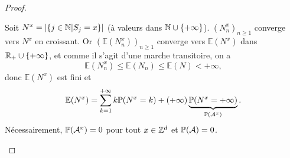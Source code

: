 \documentclass[12pt]{article}
\begin{document}
\begin{proof}
\begin{enumerate}
        Soit $N^{x}=\left\lvert\left\lbrace j\in\N\middle| S_j=x\right\rbrace\right\rvert$ (à valeurs dans $\N\cup \lbrace+\infty\rbrace$). $(N_{n}^{x})_{n\geqslant1}$ converge vers $N^{x}$ en croissant. Or $(\mathbb{E}(N_{n}^{x}))_{n\geqslant1}$ converge vers $\mathbb{E}(N^{x})$ dans $\R_{+}\cup\lbrace+\infty\rbrace$, et comme il s'agit d'une marche transitoire, on a 
        \begin{equation}
            \mathbb{E}(N_{n}^{x})\leqslant\mathbb{E}(N_{n})\leqslant\mathbb{E}(N)<+\infty,
        \end{equation}
        donc $\mathbb{E}(N^{x})$ est fini et 
        \begin{equation}
            \mathbb{E}(N^{x})=\sum_{k=1}^{+\infty}k\P(N^{x}=k)+(+\infty)\underbrace{\P(N^{x}=+\infty)}_{\P(\mathcal{A}^{x})}.
        \end{equation}
        Nécessairement, $\P(\mathcal{A}^{x})=0$ pour tout $x\in\Z^{d}$ et $\P(\mathcal{A})=0$.
    \end{enumerate}
\end{proof}
\end{document}
